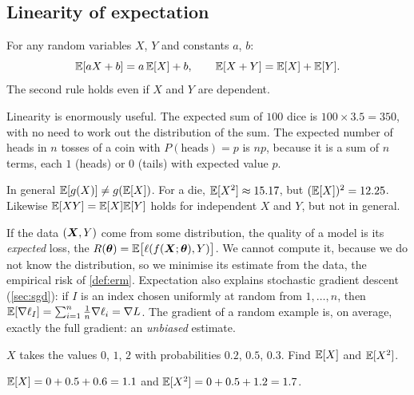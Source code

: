 \subsection{Linearity of expectation}

\begin{theorem}\label{thm:linearity-expectation}
For any random variables $X$, $Y$ and constants $a$, $b$:
\[
  \mathbb{E}[aX + b] = a\,\mathbb{E}[X] + b, \qquad \mathbb{E}[X + Y] = \mathbb{E}[X] + \mathbb{E}[Y] .
\]
The second rule holds even if $X$ and $Y$ are dependent.
\end{theorem}

Linearity is enormously useful. The expected sum of $100$ dice is
$100\times3.5 = 350$, with no need to work out the distribution of the sum. The
expected number of heads in $n$ tosses of a coin with $P(\text{heads}) = p$ is
$np$, because it is a sum of $n$ terms, each $1$ (heads) or $0$ (tails) with
expected value $p$.

\begin{pitfall}
In general $\mathbb{E}[g(X)] \neq g(\mathbb{E}[X])$. For a die, $\mathbb{E}[X^2] \approx 15.17$, but
$(\mathbb{E}[X])^2 = 12.25$. Likewise $\mathbb{E}[XY] = \mathbb{E}[X]\mathbb{E}[Y]$ holds for independent $X$ and
$Y$, but not in general.
\end{pitfall}

\begin{mlnote}
If the data $(\bm{X}, Y)$ come from some distribution, the quality of a model is
its \emph{expected} loss, the 
$R(\bm{\theta}) = \mathbb{E}\bigl[\ell(f(\bm{X};\bm{\theta}), Y)\bigr]$. We cannot compute it, because
we do not know the distribution, so we minimise its estimate from the data, the
empirical risk of \cref{def:erm}. Expectation also explains stochastic gradient
descent (\cref{sec:sgd}): if $I$ is an index chosen uniformly at random from
$1, \dots, n$, then
$\mathbb{E}[\nabla\ell_I] = \sum_{i=1}^n\frac1n\nabla\ell_i = \nabla L$. The gradient of a
random example is, on average, exactly the full gradient: an \emph{unbiased}
estimate.
\end{mlnote}

\sectionexercises

\begin{exercise}
$X$ takes the values $0$, $1$, $2$ with probabilities $0.2$, $0.5$, $0.3$. Find
$\mathbb{E}[X]$ and $\mathbb{E}[X^2]$.
\end{exercise}
\begin{solution}
$\mathbb{E}[X] = 0 + 0.5 + 0.6 = 1.1$ and $\mathbb{E}[X^2] = 0 + 0.5 + 1.2 = 1.7$.
\end{solution}

